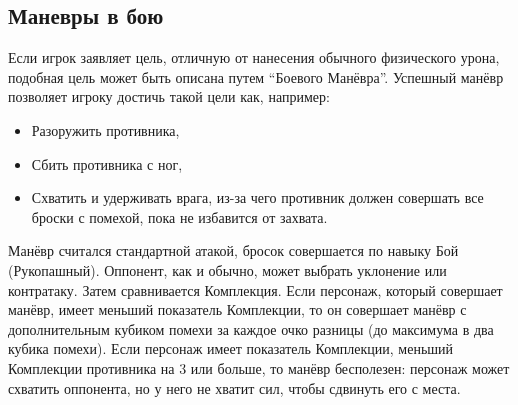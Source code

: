 \documentclass[letterpaper,twocolumn,openany, twoside, 11pt, usenames]{cocbook}
\newlength{\seplinewidth}
\newlength{\seplinesep}
\newcommand*{\sepline}{%
  \par
  \vspace{\dimexpr\seplinesep+.5\parskip}%
  \cleaders\vbox{%
    \begingroup %
      \color{sepline}%
      \hrule width\linewidth height\seplinewidth
    \endgroup
  }\vskip\seplinewidth
  \vspace{\dimexpr\seplinesep-.5\parskip}%
}
\begin{document}

\smallbreak

\subsection*{Маневры в бою}

Если игрок заявляет цель, отличную от нанесения обычного физического урона, подобная цель может быть описана путем ``Боевого Манёвра''. Успешный манёвр позволяет игроку достичь такой цели как, например:

\begin{itemize}[leftmargin=4mm]
  \item Разоружить противника,
  \item Сбить противника с ног,
  \item Схватить и удерживать врага, из-за чего противник должен совершать все броски с помехой, пока не избавится от захвата.
\end{itemize}

Манёвр считался стандартной атакой, бросок совершается по навыку Бой (Рукопашный). Оппонент, как и обычно, может выбрать уклонение или контратаку. Затем сравнивается Комплекция. Если персонаж, который совершает манёвр, имеет меньший показатель Комплекции, то он совершает манёвр с дополнительным кубиком помехи за каждое очко разницы (до максимума в два кубика помехи). Если персонаж имеет показатель Комплекции, меньший Комплекции противника на 3 или больше, то манёвр бесполезен: персонаж может схватить оппонента, но у него не хватит сил, чтобы сдвинуть его с места.
\end{document}
